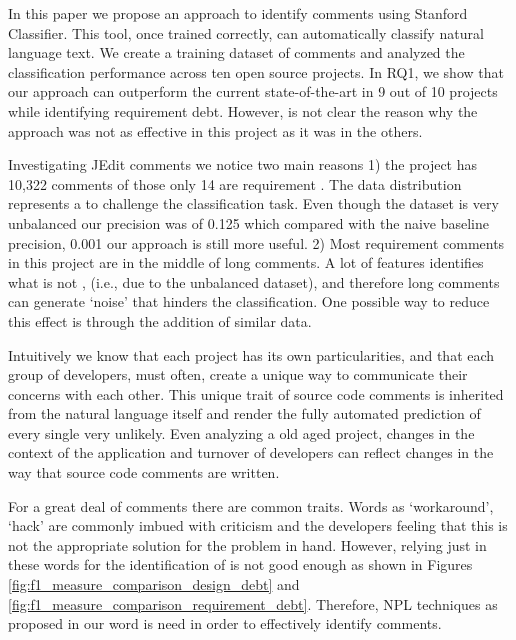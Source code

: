 In this paper we propose an approach to identify \SATD comments using Stanford Classifier. This tool, once trained correctly, can automatically classify natural language text. We create a training dataset of \SATD comments and analyzed the classification performance across ten open source projects. In RQ1, we show that our approach can outperform the current state-of-the-art in 9 out of 10 projects while identifying requirement debt. However, is not clear the reason why the approach was not as effective in this project as it was in the others.

Investigating JEdit comments we notice two main reasons 1) the project has 10,322 comments of those only 14 are requirement \SATD. The data distribution represents a to challenge the classification task. Even though the dataset is very unbalanced our precision was of 0.125 which compared with the naive baseline precision, 0.001 our approach is still more useful. 2) Most requirement \SATD comments in this project are in the middle of long comments. A lot of features identifies what is not \SATD, (i.e., due to the unbalanced dataset), and therefore long comments can generate `noise' that hinders the classification. One possible way to reduce this effect is through the addition of similar data. 

Intuitively we know that each project has its own particularities, and that each group of developers, must often, create a unique way to communicate their concerns with each other. This unique trait of source code comments is inherited from the natural language itself and render the fully automated prediction of every single \SATD very unlikely. Even analyzing a old aged project, changes in the context of the application and turnover of developers can reflect changes in the way that source code comments are written. 

For a great deal of \SATD comments there are common traits. Words as `workaround', `hack' are commonly imbued with criticism and the developers feeling that this is not the appropriate solution for the problem in hand. However, relying just in these words for the identification of \SATD is not good enough as shown in Figures \ref{fig:f1_measure_comparison_design_debt} and \ref{fig:f1_measure_comparison_requirement_debt}. Therefore, NPL techniques as proposed in our word is need in order to effectively identify \SATD comments.

